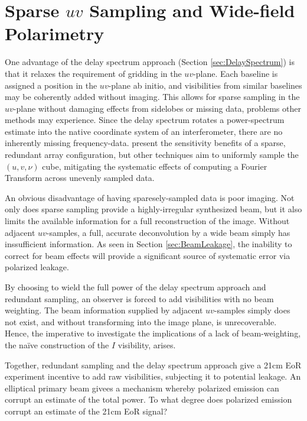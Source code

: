 \section{Sparse $uv$ Sampling and Wide-field Polarimetry}
\label{sec:SparseUV}

One advantage of the delay spectrum approach (Section \ref{sec:DelaySpectrum}) is that it relaxes
the requirement of gridding in the $uv$-plane. Each baseline is assigned a position in the
$uv$-plane ab initio, and visibilities from similar baselines may be coherently added without
imaging. This allows for sparse sampling in the $uv$-plane without damaging effects from sidelobes
or missing data, problems other methods may experience. Since the delay spectrum rotates a
power-spectrum estimate into the native coordinate system of an interferometer, there are no
inherently missing frequency-data. \citet{PAPERSensitivity} present the sensitivity benefits of a sparse,
redundant array configuration, but other techniques aim to uniformly sample the $(u,v,\nu)$
cube, mitigating the systematic effects of computing a Fourier Transform across unevenly sampled data.

An obvious disadvantage of having sparesely-sampled data is poor imaging. Not only does sparse
sampling provide a highly-irregular synthesized beam, but it also limits the available information
for a full reconstruction of the image. Without adjacent $uv$-samples, a full, accurate
deconvolution by a wide beam simply has inssufficient information. As seen in Section
\ref{sec:BeamLeakage}, the inability to correct for beam effects will provide a significant source
of systematic error via polarized leakage.

By choosing to wield the full power of the delay spectrum approach and redundant sampling, an
observer is forced to add visibilities with no beam weighting. The beam information supplied by
adjacent $uv$-samples simply does not exist, and without transforming into the image plane, is
unrecoverable. Hence, the imperative to investigate the implications of a lack of beam-weighting,
the na\"{i}ve construction of the $I$ visibility, arises.

Together, redundant sampling and the delay spectrum approach give a 21cm EoR experiment incentive to
add raw visibilities, subjecting it to potential leakage. An elliptical primary beam givees a
mechanism whereby polarized emission can corrupt an estimate of the total power. To what degree does
polarized emission corrupt an estimate of the 21cm EoR signal?
